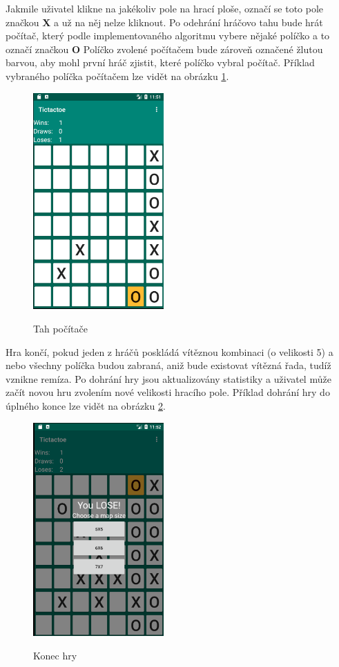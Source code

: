 \documentclass[12pt, a4paper]{article}
\begin{document}
\par
Jakmile uživatel klikne na jakékoliv pole na hrací ploše, označí se toto pole značkou \textbf{X} a už na něj nelze kliknout. Po odehrání hráčovo tahu bude hrát počítač, který podle implementovaného algoritmu vybere nějaké políčko a to označí značkou \textbf{O} Políčko zvolené počítačem bude zároveň označené žlutou barvou, aby mohl první hráč zjistit, které políčko vybral počítač. Příklad vybraného políčka počítačem lze vidět na obrázku \ref{fig:move}.
	\begin{figure}[h!]
	\centering
	\includegraphics[width=5cm]{img/highlighted}\\
	\caption{Tah počítače}
	\label{fig:move}
	\end{figure}
\newpage
Hra končí, pokud jeden z hráčů poskládá vítěznou kombinaci (o velikosti 5) a nebo všechny políčka budou zabraná, aniž bude existovat vítězná řada, tudíž vznikne remíza. Po dohrání hry jsou aktualizovány statistiky a uživatel může začít novou hru zvolením nové velikosti hracího pole. Příklad dohrání hry do úplného konce lze vidět na obrázku \ref{fig:endgame}.
	\begin{figure}[h!]
	\centering
	\includegraphics[width=5cm]{img/endgame}\\
	\caption{Konec hry}
	\label{fig:endgame}
	\end{figure}
\newpage
\end{document}
